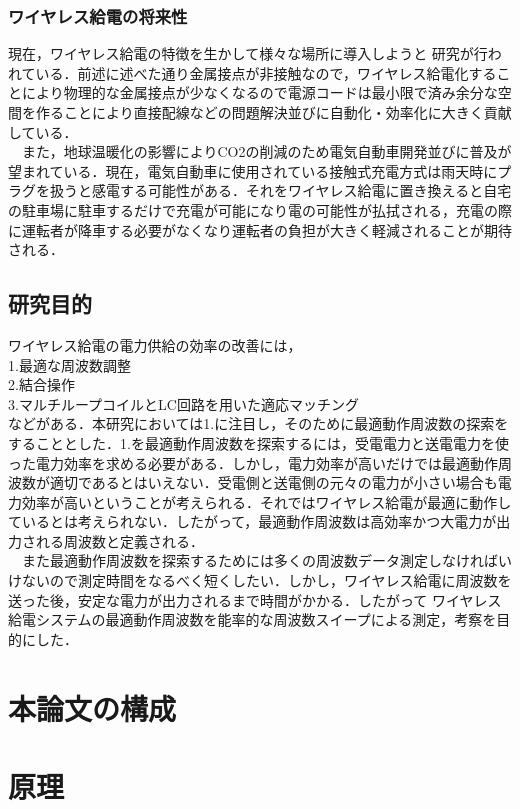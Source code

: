 \documentclass[12pt]{jarticle}
\begin{document}
\subsubsection{ワイヤレス給電の将来性}
現在，ワイヤレス給電の特徴を生かして様々な場所に導入しようと 研究が行われている．前述に述べた通り金属接点が非接触なので，ワイヤレス給電化することにより物理的な金属接点が少なくなるので電源コードは最小限で済み余分な空間を作ることにより直接配線などの問題解決並びに自動化・効率化に大きく貢献している\cite{syourai}\cite{matuda}．
\\　また，地球温暖化の影響によりCO{\tiny 2}の削減のため電気自動車開発並びに普及が望まれている．現在，電気自動車に使用されている接触式充電方式は雨天時にプラグを扱うと感電する可能性がある．それをワイヤレス給電に置き換えると自宅の駐車場に駐車するだけで充電が可能になり電の可能性が払拭される，充電の際に運転者が降車する必要がなくなり運転者の負担が大きく軽減されることが期待される．\cite{hakugin}
\clearpage
\subsection{研究目的}
ワイヤレス給電の電力供給の効率の改善には，
\\1.最適な周波数調整
\\2.結合操作
\\3.マルチループコイルとLC回路を用いた適応マッチング
\\などがある\cite{morita}．本研究においては1.に注目し，そのために最適動作周波数の探索をすることとした．1.を最適動作周波数を探索するには，受電電力と送電電力を使った電力効率を求める必要がある．しかし，電力効率が高いだけでは最適動作周波数が適切であるとはいえない．受電側と送電側の元々の電力が小さい場合も電力効率が高いということが考えられる．それではワイヤレス給電が最適に動作しているとは考えられない．したがって，最適動作周波数は高効率かつ大電力が出力される周波数と定義される．
\\　また最適動作周波数を探索するためには多くの周波数データ測定しなければいけないので測定時間をなるべく短くしたい．しかし，ワイヤレス給電に周波数を送った後，安定な電力が出力されるまで時間がかかる．したがって%
ワイヤレス給電システムの最適動作周波数を能率的な周波数スイープによる測定，考察を目的にした．
\clearpage
\section{本論文の構成}

\clearpage
\section{原理}
\end{document}
